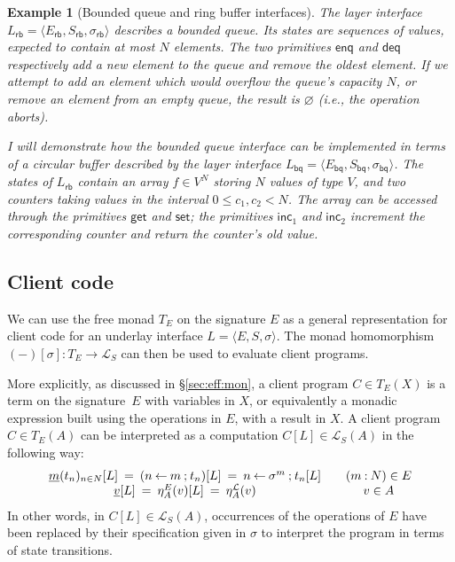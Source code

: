 \documentclass[11pt,oneside]{book}
\newtheorem{example}[theorem]{Example}
\theoremstyle{definition}
\newcommand{\kw}[1]{\ensuremath{ \mathsf{#1} }}
\newcommand{\ul}[1]{%
  \underline{\smash{#1}}
}
\begin{document}
\begin{example}[Bounded queue and ring buffer interfaces] %
The layer interface
$L_\kw{rb} = \langle E_\kw{rb}, S_\kw{rb}, \sigma_\kw{rb} \rangle$
describes a bounded queue.
Its states are sequences of values,
expected to contain at most $N$ elements.
The two primitives
$\kw{enq}$ and $\kw{deq}$
respectively add a new element to the queue
and remove the oldest element.
If we attempt to add an element
which would overflow the queue's capacity $N$,
or remove an element from an empty queue,
the result is $\varnothing$ (i.e., the operation aborts).

I will demonstrate how the bounded queue interface
can be implemented in terms of a circular buffer
described by the layer interface
$L_\kw{bq} = \langle E_\kw{bq}, S_\kw{bq}, \sigma_\kw{bq} \rangle$.
The states of $L_\kw{rb}$
contain an array $f \in V^N$
storing $N$ values of type $V$,
and two counters
taking values in the interval $0 \le c_1, c_2 < N$.
The array can be accessed through the primitives
$\kw{get}$ and $\kw{set}$;
the primitives $\kw{inc}_1$ and $\kw{inc}_2$
increment the corresponding counter
and return the counter's old value.
\end{example}


\subsection{Client code} \label{sec:cal:cli} %

We can use the free monad $T_E$ on the signature $E$
as a general representation for client code for
an underlay interface $L = \langle E, S, \sigma \rangle$.
The monad homomorphism $(-)[\sigma] : T_E \rightarrow \mathcal{L}_S$
can then be used to evaluate client programs.

More explicitly,
as discussed in \S\ref{sec:eff:mon},
a client program $C \in T_E(X)$
is a term on the signature~$E$ with variables in $X$,
or equivalently a monadic expression built using
the operations in $E$, with a result in $X$.
A client program $C \in T_E(A)$
can be interpreted as
a computation $C[L] \in \mathcal{L}_S(A)$ in the following way:
\[
  \begin{array}{c@{\qquad}c}
    \ul{m}(t_n)_{n \in N}[L] \: = \:
      (n \mathbin\leftarrow m \mathbin; t_n)[L] \: = \:
      n \mathbin\leftarrow \sigma^m \mathbin; t_n[L] &
      (m \mathbin: N) \in E \\
    \ul{v}[L] \: = \:
      \eta^E_A(v)[L] \: = \:
      \eta^\mathcal{L}_A(v) &
      v \in A
  \end{array}
\]
In other words, in $C[L] \in \mathcal{L}_S(A)$,
occurrences of the operations of $E$
have been replaced by their specification given in $\sigma$
to interpret the program in terms of state transitions.
\end{document}
